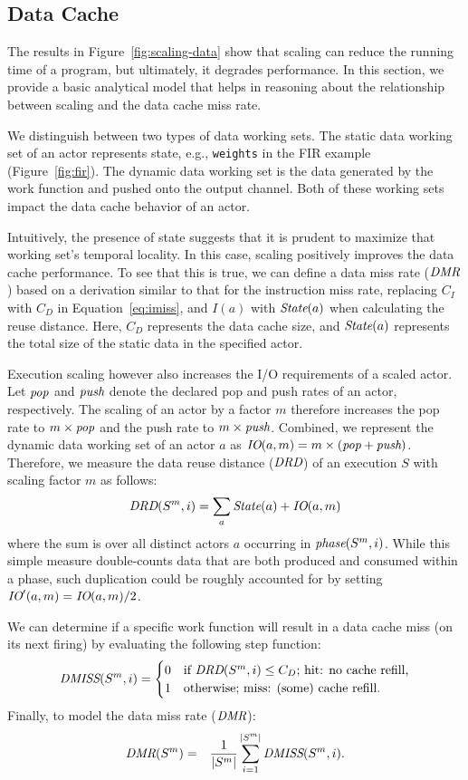 \subsection{Data Cache}

The results in Figure~\ref{fig:scaling-data} show that scaling can
reduce the running time of a program, but ultimately, it degrades
performance. In this section, we provide a basic analytical model that
helps in reasoning about the relationship between scaling and the data
cache miss rate. 

We distinguish between two types of data working sets. The static data
working set of an actor represents state, e.g., \texttt{weights} in
the FIR example (Figure~\ref{fig:fir}).  The dynamic data
working set is the data generated by the work function and pushed onto
the output channel. Both of these working sets impact the data cache
behavior of an actor.

Intuitively, the presence of state suggests that it is
prudent to maximize that working set's temporal locality. In this
case, scaling positively improves the data cache performance. To see
that this is true, we can define a data miss rate ($\mbox{\it DMR}$) based on
a derivation similar to that for the instruction miss rate, replacing
$C_I$ with $C_D$ in Equation~\ref{eq:imiss}, and $I(a)$ with
$\mbox{\it State}(a)$ when calculating the reuse distance. Here, $C_D$
represents the data cache size, and
$\mbox{\it State}(a)$ represents the total size of the static data in the
specified actor. 

Execution scaling however also increases the I/O requirements of a
scaled actor. Let $\mbox{\it pop}$ and $\mbox{\it push}$ denote the declared pop and push rates
of an actor, respectively.  The scaling of an
actor by a factor $m$ therefore increases the pop rate to $m\times \mbox{\it pop}$
and the push rate to $m\times \mbox{\it push}$. Combined, we represent the dynamic
data working set of an actor $a$ as $\mbox{\it IO}(a, m) =
m\times(\mbox{\it pop}+\mbox{\it push})$. Therefore, we measure the data reuse distance ($\mbox{\it DRD}$)
of an execution $S$ with scaling factor $m$ as follows:
\[
  \mbox{\it DRD}(S^m,i)=\sum_{a} \mbox{\it State}(a) + \mbox{\it IO}(a,m)
\]
where the sum is over all distinct actors $a$ occurring in $\mbox{\it phase}(S^m,i)$.  While
this simple measure double-counts data that are both produced and
consumed within a phase, such duplication could be roughly accounted
for by setting $\mbox{\it IO}'(a,m) = \mbox{\it IO}(a,m) / 2$.

We can determine if a
specific work function will result in a data cache miss (on its next
firing) by evaluating the following step function:
\begin{equation}
\label{eq:dmiss}
  \mbox{\it DMISS}(S^m,i) =
    \begin{cases}
      0& \text{if $\mbox{\it DRD}(S^m,i) \leq C_D$; hit: no cache refill,}\\
      1& \text{otherwise; miss: (some) cache refill.}
    \end{cases}
\end{equation}
Finally, to model the data miss rate ($\mbox{\it DMR}$):
\begin{eqnarray}
  \label{eq:dmrM}
  \mbox{\it DMR}(S^m) &=& \frac{1}{|S^m|}\sum_{i=1}^{|S^m|} \mbox{\it DMISS}(S^m,i).
\end{eqnarray}

